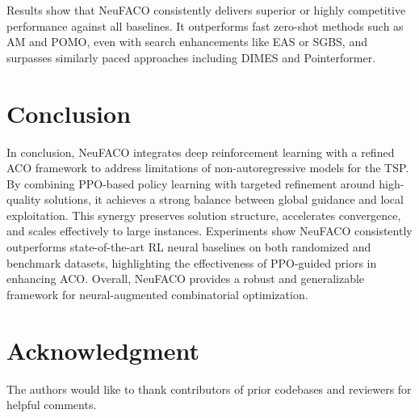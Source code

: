 \documentclass[a4paper,conference]{IEEEtran}
\begin{document}
Results show that NeuFACO consistently delivers superior or highly competitive performance against all baselines. It outperforms fast zero-shot methods such as AM and POMO, even with search enhancements like EAS or SGBS, and surpasses similarly paced approaches including DIMES and Pointerformer.

\section{Conclusion}
In conclusion, NeuFACO integrates deep reinforcement learning with a refined ACO framework to address limitations of non-autoregressive models for the TSP. By combining PPO-based policy learning with targeted refinement around high-quality solutions, it achieves a strong balance between global guidance and local exploitation. This synergy preserves solution structure, accelerates convergence, and scales effectively to large instances. Experiments show NeuFACO consistently outperforms state-of-the-art RL neural baselines on both randomized and benchmark datasets, highlighting the effectiveness of PPO-guided priors in enhancing ACO. Overall, NeuFACO provides a robust and generalizable framework for neural-augmented combinatorial optimization.

\section*{Acknowledgment}
The authors would like to thank contributors of prior codebases and reviewers for helpful comments.



\end{document}
